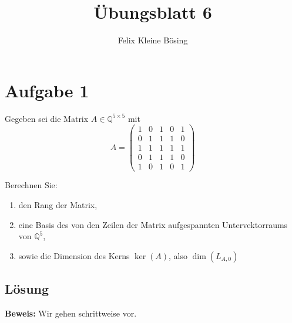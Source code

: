 \documentclass[11pt]{article}
\begin{document}
\title{Übungsblatt 6}
\author{Felix Kleine Bösing}
\maketitle

\section*{Aufgabe 1}

Gegeben sei die Matrix \( A \in \mathbb{Q}^{5 \times 5} \) mit
\[
A =
\begin{pmatrix}
1 & 0 & 1 & 0 & 1 \\
0 & 1 & 1 & 1 & 0 \\
1 & 1 & 1 & 1 & 1 \\
0 & 1 & 1 & 1 & 0 \\
1 & 0 & 1 & 0 & 1
\end{pmatrix}
\]

Berechnen Sie:
\begin{enumerate}
    \item den Rang der Matrix,
    \item eine Basis des von den Zeilen der Matrix aufgespannten Untervektorraums von \( \mathbb{Q}^5 \),
    \item sowie die Dimension des Kerns \( \ker(A) \), also \( \dim(L_{A, 0}) \)
\end{enumerate}

\subsection*{Lösung}

\textbf{Beweis:} Wir gehen schrittweise vor.
\end{document}

